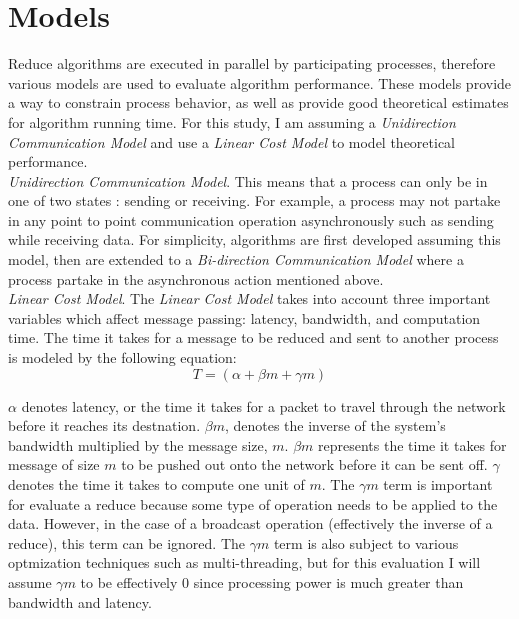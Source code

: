 \documentclass{article}
\begin{document}
\section{Models}

Reduce algorithms are executed in parallel by participating processes, therefore various models are
used to evaluate algorithm performance. These models provide a way to constrain process behavior, as
well as provide good theoretical estimates for algorithm running time. For this study, I am assuming
a \textit{Unidirection Communication Model} and use a \textit{Linear Cost Model} to model 
theoretical performance. \\

\textit{Unidirection Communication Model}. This means that a process can only be in one of two 
states
: sending or receiving. For example, a process may not partake in any point to point communication
operation asynchronously such as sending while receiving data. For simplicity, algorithms are first
developed assuming this model, then are extended to a \textit{Bi-direction Communication Model} 
where a process partake in the asynchronous action mentioned above. \\ 

\textit{Linear Cost Model}. The \textit{Linear Cost Model} takes into account three important 
variables which affect message passing: latency, bandwidth, and computation time. The time it takes
for a message to be reduced and sent to another process is modeled by the following equation:
$$T = (\alpha + \beta m + \gamma m)$$

\noindent $\alpha$ denotes latency, or the time it takes for a packet to travel through the network before
it reaches its destnation. $\beta m$, denotes the inverse of the system's bandwidth multiplied by
the message size, $m$. $\beta m$ represents the time it takes for message of size $m$ to be pushed
out onto the network before it can be sent off. $\gamma$ denotes the time it takes to compute one 
unit of $m$. The $\gamma m$ term is important for evaluate a reduce because some type of operation
needs to be applied to the data. However, in the case of a broadcast operation (effectively the
inverse of a reduce), this term can be ignored. The $\gamma m$ term is also subject to various 
optmization techniques such as multi-threading, but for this evaluation I will assume $\gamma m$ to
be effectively 0 since processing power is much greater than bandwidth and latency. \\
\end{document}
